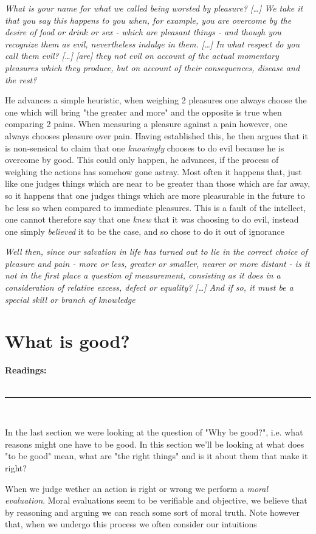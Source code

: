\documentclass[english,course]{Notes}
\newcommand{\ita}[1]{\textit{#1}}
\newcommand\readings{\textbf{Readings:} \\}
\newcommand\sep{\\ \noindent\rule{10cm}{0.8pt} \\}
\newcommand\quo[1]{\begin{displayquote}\ita{\large{#1}}\end{displayquote}}
\begin{document}
{{\quo{What is your name for what we called being worsted by pleasure? [\dots] We take it that you say this happens to you when, for example, you are overcome by the desire of food or drink or sex - which are pleasant things - and though you recognize them as evil, nevertheless indulge in them. [\dots] In what respect do you call them evil? [\dots] [are] they not evil on account of the actual momentary pleasures which they produce, but on account of their consequences, disease and the rest?}

\par{He advances a simple heuristic, when weighing 2 pleasures one always choose the one which will bring "the greater and more" and the opposite is true when comparing 2 pains. When measuring a pleasure against a pain however, one always chooses pleasure over pain. Having established this, he then argues that it is non-sensical to claim that one \ita{knowingly} chooses to do evil because he is overcome by good. This could only happen, he advances, if the process of weighing the actions has somehow gone astray. Most often it happens that, just like one judges things which are near to be greater than those which are far away, so it happens that one judges things which are more pleasurable in the future to be less so when compared to immediate pleasures. This is a fault of the intellect, one cannot therefore say that one \ita{knew} that it was choosing to do evil, instead one simply \ita{believed} it to be the case, and so chose to do it out of ignorance}
\newpage
\quo{Well then, since our salvation in life has turned out to lie in the correct choice of pleasure and pain - more or less, greater or smaller, nearer or more distant - is it not in the first place a question of measurement, consisting as it does in a consideration of relative excess, defect or equality? [\dots] And if so, it must be a special skill or branch of knowledge}

\newpage

\section{What is good?}

\readings \cite[Chapters 1]{driver_2014} 
\sep

\par{In the last section we were looking at the question of "Why be good?", i.e. what reasons might one have to be good. In this section we'll be looking at what does "to be good" mean, what are "the right things" and is it about them that make it right?}
\par{ When we judge wether an action is right or wrong we perform a \ita{moral evaluation}. Moral evaluations seem to be verifiable and objective, we believe that by reasoning and arguing we can reach some sort of moral truth. Note however that, when we undergo this process we often consider our intuitions}

}}
\end{document}
